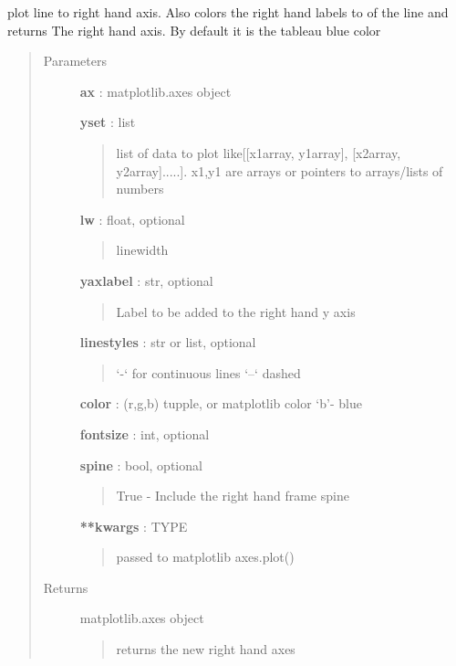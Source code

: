 \documentclass[letterpaper,10pt,english]{sphinxmanual}
\begin{document}

\begin{fulllineitems}
\label{pubplots:pubplots.plot.plot_lright}
plot line to right hand axis. Also colors the right hand labels to of the line and returns
The right hand axis. By default it is the tableau blue color
\begin{quote}\begin{description}
\item[{Parameters}] \leavevmode
\textbf{ax} : matplotlib.axes object

\textbf{yset} : list
\begin{quote}

list of data to plot like{[}{[}x1array, y1array{]}, {[}x2array, y2array{]}.....{]}.
x1,y1 are arrays or pointers to arrays/lists of numbers
\end{quote}

\textbf{lw} : float, optional
\begin{quote}

linewidth
\end{quote}

\textbf{yaxlabel} : str, optional
\begin{quote}

Label to be added to the right hand y axis
\end{quote}

\textbf{linestyles} : str or list, optional
\begin{quote}

`-` for continuous lines `--` dashed
\end{quote}

\textbf{color} : (r,g,b) tupple, or matplotlib color `b'- blue

\textbf{fontsize} : int, optional

\textbf{spine} : bool, optional
\begin{quote}

True - Include the right hand frame spine
\end{quote}

\textbf{**kwargs} : TYPE
\begin{quote}

passed to matplotlib axes.plot()
\end{quote}

\item[{Returns}] \leavevmode
matplotlib.axes object
\begin{quote}

returns the new right hand axes
\end{quote}

\end{description}\end{quote}

\end{fulllineitems}
\end{document}
